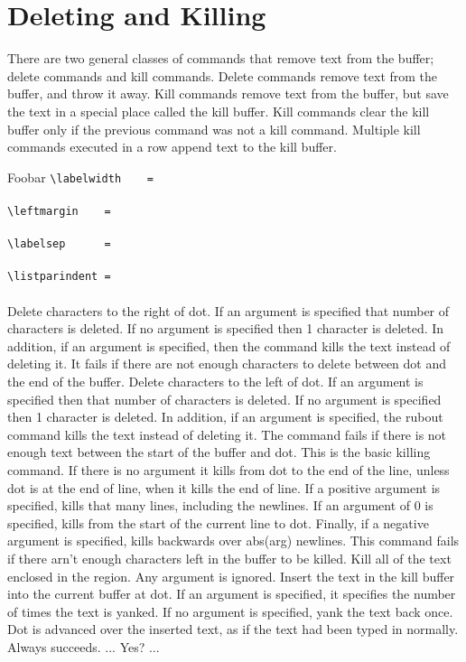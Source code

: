 \section{Deleting and Killing}
There are two general classes of commands that remove text from the
buffer; delete commands and kill commands.
Delete commands remove text from the buffer, and throw it away.
Kill commands remove text from the buffer, but save the text in a special
place called the kill buffer. Kill commands clear the kill buffer only
if the previous command was not a kill command. Multiple kill commands
executed in a row append text to the kill buffer.
\begin{cmdlist}
 \item[Foobar]
 \verb+\labelwidth    = + \\
	\framebox[\labelwidth]{*}	\\
 \verb+\leftmargin    = + \\
	\framebox[\leftmargin]{*}	\\
 \verb+\labelsep      = + \\
	\framebox[\labelsep]{*}	\\
 \verb+\listparindent = + \\
	\framebox[\listparindent]{*}	\\

Delete characters to the right of dot. If an argument is
specified that number of characters is deleted. If no argument is specified
then 1 character is deleted. In addition, if an argument is specified,
then the command kills the text instead of deleting it. It fails if
there are not enough characters to delete between dot and the end of
the buffer.
Delete characters to the left of dot. If an argument is
specified then that number of characters is deleted. If no argument is
specified then 1 character is deleted. In addition, if an argument is
specified, the rubout command kills the text instead of deleting it.
The command fails if there is not enough text between the start of the
buffer and dot.
This is the basic killing command. If there is no argument
it kills from dot to the end of the line, unless dot is at the
end of line, when it kills the end of line.
If a positive argument is specified,  kills that many lines,
including the newlines.
If an argument of 0 is specified,  kills from the start of the current
line to dot.
Finally, if a negative argument is specified,  kills backwards over
abs(arg) newlines. This command fails if there arn't enough characters
left in the buffer to be killed.
Kill all of the text enclosed in the region. Any argument
is ignored.
Insert the text in the kill buffer into the current buffer
at dot. If an argument is specified, it specifies the number of times
the text is yanked. If no argument is specified, yank the text back
once. Dot is advanced over the inserted text, as if the text had
been typed in normally. Always succeeds.
... Yes? ...
\end{cmdlist}
